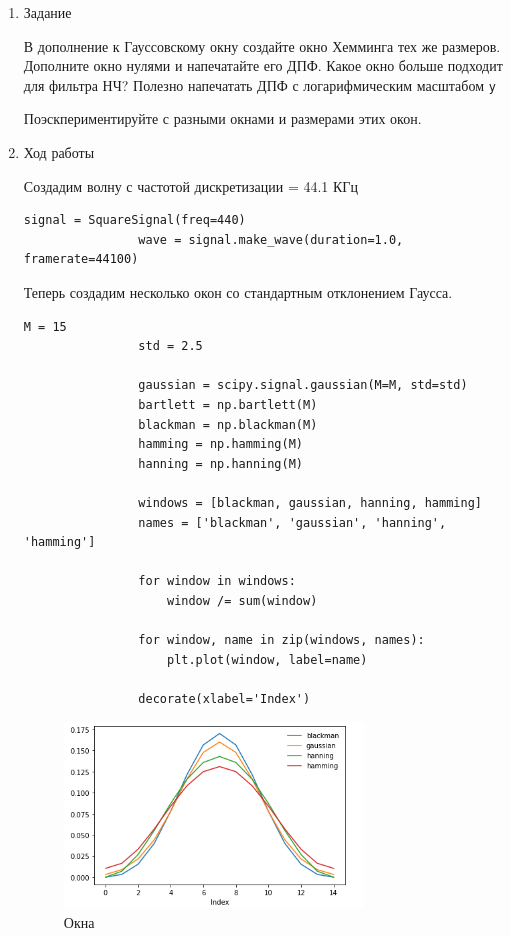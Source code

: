 \documentclass[a4paper,12pt]{article}
\begin{document}
\begin{enumerate}
\begin{enumerate}
			\item{Задание}
			
			В дополнение к Гауссовскому окну создайте окно Хемминга тех же размеров. Дополните окно нулями и напечатайте его ДПФ. Какое окно больше подходит для фильтра НЧ? Полезно напечатать ДПФ с логарифмическим масштабом \texttt{y}
			
			Поэскпериментируйте с разными окнами и размерами этих окон.
			
			\item{Ход работы}
			
			Создадим волну с частотой дискретизации = 44.1 КГц
			\begin{lstlisting}[caption=Создаем волну]
				signal = SquareSignal(freq=440)
				wave = signal.make_wave(duration=1.0, framerate=44100)
			\end{lstlisting}
			
			Теперь создадим несколько окон со стандартным отклонением Гаусса.
			\begin{lstlisting}[caption=Создаем окна]
				M = 15
				std = 2.5
				
				gaussian = scipy.signal.gaussian(M=M, std=std)   
				bartlett = np.bartlett(M)
				blackman = np.blackman(M)
				hamming = np.hamming(M)
				hanning = np.hanning(M)
				
				windows = [blackman, gaussian, hanning, hamming]
				names = ['blackman', 'gaussian', 'hanning', 'hamming']
				
				for window in windows:
					window /= sum(window)
				
				for window, name in zip(windows, names):
					plt.plot(window, label=name)
				
				decorate(xlabel='Index')
			\end{lstlisting}
			\begin{figure}[H]
				\centering
				\includegraphics[width=0.75\textwidth]{3_1.png}
				\caption{Окна}
				\label{fig:3.1}
			\end{figure}
			

\end{enumerate}
\end{enumerate}
\end{document}
